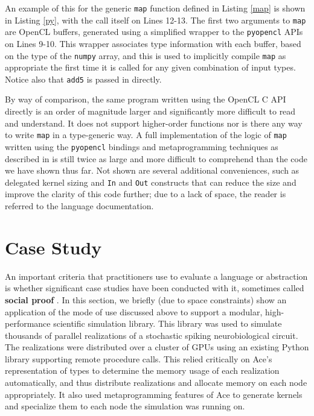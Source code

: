 \documentclass[9pt,preprint]{sigplanconf}
\begin{document}
An example of this for the generic \verb|map| function defined in Listing \ref{map} is shown in Listing \ref{py}, with the call itself on Lines 12-13. 
The first two arguments to \verb|map| are OpenCL buffers, generated using a simplified wrapper to the \verb|pyopencl| APIs on Lines 9-10. This wrapper associates type information with each buffer, based on the type of the \verb|numpy| array, and this is used to implicitly compile \verb|map| as appropriate the first time it is called for any given combination of input types. Notice also that \verb|add5| is passed in directly.

By way of comparison, the same program written using the OpenCL C API directly is an order of magnitude larger and significantly more difficult to read and understand. It does not support higher-order functions nor is there any way to write \verb|map| in a type-generic way. A full implementation of the logic of \verb|map| written using the \verb|pyopencl| bindings and metaprogramming techniques as described in \cite{klockner2011pycuda} is still twice as large and more difficult to comprehend than the code we have shown thus far. Not shown are several additional conveniences, such as delegated kernel sizing and \verb|In| and \verb|Out| constructs that can reduce the size and improve the clarity of this code further; due to a lack of space, the reader is referred to the language documentation.


\section{Case Study}\label{casestudy}
An important criteria that practitioners use to evaluate a language or abstraction is whether significant case studies have been conducted with it, sometimes called \textbf{social proof} \cite{basili2008understanding}. In this section, we briefly (due to space constraints) show an application of the mode of use discussed above to support a modular, high-performance scientific simulation library. This library was used to simulate  thousands of parallel realizations of a stochastic spiking neurobiological circuit. The realizations were distributed over a cluster of GPUs using an existing Python library supporting remote procedure calls. This relied critically on Ace's representation of types to determine the memory usage of each realization automatically, and thus distribute realizations and allocate memory on each node appropriately. It also used metaprogramming features of Ace to generate kernels and specialize them to each node the simulation was running on.
\end{document}
